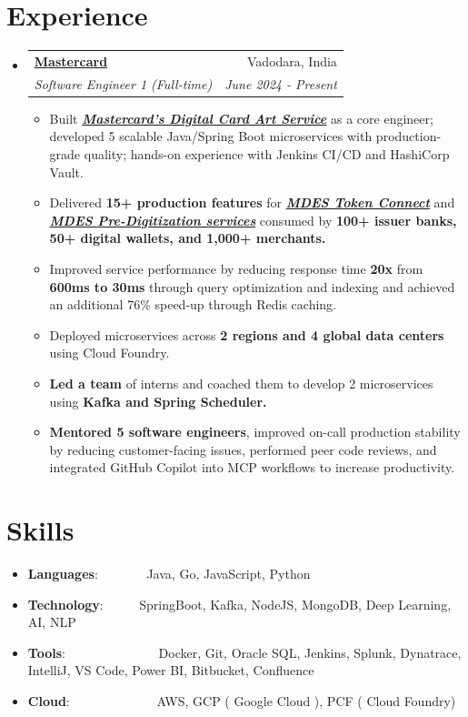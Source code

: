 \documentclass[a4paper,10pt]{article}
\makeatletter
\newcommand{\resumeItem}[2]{
  \item\small{
    \textbf{#1}{: #2 \vspace{-2pt}}
  }
}
\newcommand{\resumeSubheading}[4]{
  \vspace{-1pt}\item
    \begin{tabular*}{0.97\textwidth}{l@{\extracolsep{\fill}}r}
      \textbf{#1} & #2 \\
      \textit{#3} & \textit{#4} \\
    \end{tabular*}\vspace{-5pt}
}
\newcommand{\resumeSubItem}[2]{\resumeItem{#1}{#2}\vspace{-3pt}}
\newcommand{\resumeSubHeadingListStart}{\begin{itemize}[leftmargin=*]}
\newcommand{\resumeSubHeadingListEnd}{\end{itemize}}
\makeatother
\begin{document}
\section{Experience}
  \resumeSubHeadingListStart
    \resumeSubheading{\href{https://www.mastercard.co.in/en-in.html}{Mastercard}}{Vadodara, India}
    {Software Engineer 1 (Full-time)}{June 2024 - Present}
    \begin{itemize}[leftmargin=*]

        \item Built \textbf{\textit{\href{https://developer.mastercard.com/mdes-digital-card-art-service/documentation/}{Mastercard’s Digital Card Art Service}}} as a core engineer; developed 5 scalable Java/Spring Boot microservices with production-grade quality; hands-on experience with Jenkins CI/CD and HashiCorp Vault.

        \item Delivered \textbf{15+ production features} for \textbf{\textit{\href{https://developer.mastercard.com/mdes-token-connect/documentation/}{MDES Token Connect}}} and \textbf{\textit{\href{https://developer.mastercard.com/mdes-pre-digitization/documentation/}{MDES Pre-Digitization services}}} consumed by \textbf{100+ issuer banks, 50+ digital wallets, and 1,000+ merchants.}

        \item Improved service performance by reducing response time \textbf{20x} from \textbf{600ms to 30ms} through query optimization and indexing and achieved an additional 76\% speed-up through Redis caching.

        \item Deployed microservices across \textbf{2 regions and 4 global data centers} using Cloud Foundry.

        \item \textbf{Led a team} of interns and coached them to develop 2 microservices using \textbf{Kafka and Spring Scheduler.}

        \item \textbf{Mentored 5 software engineers}, improved on-call production stability by reducing customer-facing issues, performed peer code reviews, and integrated GitHub Copilot into MCP workflows to increase productivity.

    \end{itemize}

\resumeSubHeadingListEnd
    
\section{Skills}
	\resumeSubHeadingListStart
	\resumeSubItem{Languages}{~~~~~~~Java, Go, JavaScript, Python}
	\resumeSubItem{Technology}{~~~~~SpringBoot, Kafka, NodeJS, MongoDB, Deep Learning, AI, NLP}
	\resumeSubItem{Tools}{~~~~~~~~~~~~~~Docker, Git, Oracle SQL, Jenkins, Splunk, Dynatrace, IntelliJ, VS Code, Power BI, Bitbucket, Confluence}
	\resumeSubItem{Cloud}{~~~~~~~~~~~~~AWS, GCP ( Google Cloud ), PCF ( Cloud Foundry) }
\vspace{4pt}    
\resumeSubHeadingListEnd
\end{document}
